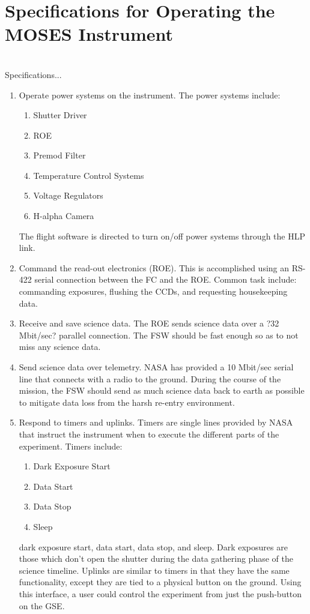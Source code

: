 %
\section{Specifications for Operating the MOSES Instrument}
\hrulefill
\\
Specifications...
\begin{enumerate}
  \item Operate power systems on the instrument. The power systems include: 
	\begin{enumerate}
		\item Shutter Driver
		\item ROE
		\item Premod Filter
		\item Temperature Control Systems
		\item Voltage Regulators
		\item H-alpha Camera
	\end{enumerate}
The flight software is directed to turn on/off power systems through the HLP link.

  \item Command the read-out electronics (ROE). This is accomplished using an RS-422 serial connection between the FC and the ROE. Common task include: commanding exposures, flushing the CCDs, and requesting housekeeping data.

  \item Receive and save science data. The ROE sends science data over a ?32 Mbit/sec? parallel connection. The FSW should be fast enough so as to not miss any science data. 

  \item Send science data over telemetry. NASA has provided a 10 Mbit/sec serial line that connects with a radio to the ground. During the course of the mission, the FSW should send as much science data back to earth as possible to mitigate data loss from the harsh re-entry environment.

  \item Respond to timers and uplinks. Timers are single lines provided by NASA that instruct the instrument when to execute the different parts of the experiment. Timers include: 
	\begin{enumerate}
		\item Dark Exposure Start
		\item Data Start
		\item Data Stop
		\item Sleep
	\end{enumerate}
dark exposure start, data start, data stop, and sleep. Dark exposures are those which don’t open the shutter during the data gathering phase of the science timeline. Uplinks are similar to timers in that they have the same functionality, except they are tied to a physical button on the ground. Using this interface, a user could control the experiment from just the push-button on the GSE. 


\end{enumerate}
